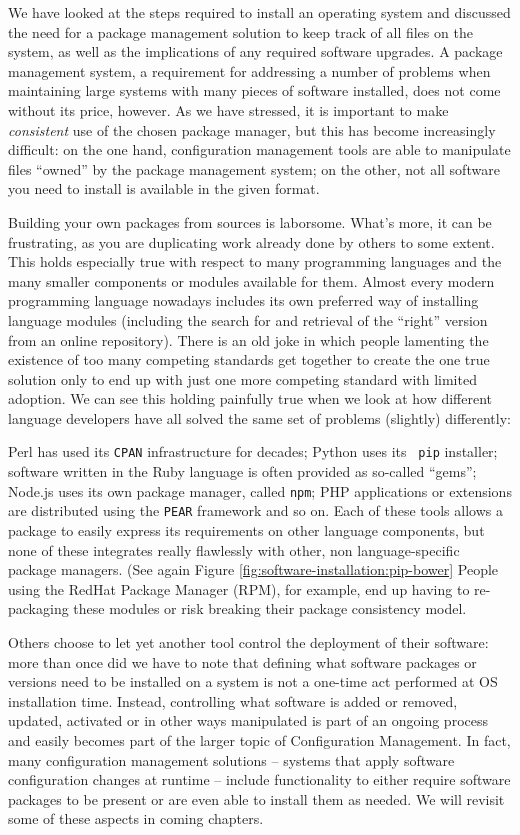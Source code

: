 We have looked at the steps required to install an
operating system and discussed the need for a package
management solution to keep track of all files on the
system, as well as the implications of any required
software upgrades.  A package management system, a
requirement for addressing a number of problems when
maintaining large systems with many pieces of software
installed, does not come without its price, however.
As we have stressed, it is important to make {\em
consistent} use of the chosen package manager, but
this has become increasingly difficult: on the one
hand, configuration management tools are able to
manipulate files ``owned'' by the package management
system; on the other, not all software you need to
install is available in the given format.

Building your own packages from sources is laborsome.
What's more, it can be frustrating, as you are
duplicating work already done by others to some
extent.  This holds especially true with respect to
many programming languages and the many smaller
components or modules available for them.  Almost
every modern programming language nowadays includes
its own preferred way of installing language modules
(including the search for and retrieval of the
``right'' version from an online repository).  There
is an old joke in which people lamenting the existence
of too many competing standards get together to create
the one true solution only to end up with just one
more competing standard with limited adoption.  We can
see this holding painfully true when we look at how
different language developers have all solved the same
set of problems (slightly) differently:

Perl has used its {\tt CPAN}
infrastructure for decades; Python uses its {\tt
pip} installer; software written in the
Ruby language is often provided as so-called
``gems''; Node.js uses its own package
manager, called {\tt npm}; PHP applications
or extensions are distributed using the {\tt PEAR}
framework and so on.  Each of these tools allows a
package to easily express its requirements on other
language components, but none of these integrates
really flawlessly with other, non language-specific
package managers. (See again Figure
\ref{fig:software-installation:pip-bower}  People
using the RedHat Package Manager (RPM), for
example, end up having to re-packaging these modules
or risk breaking their package consistency model.

Others choose to let yet another tool control the
deployment of their software: more than once did we
have to note that defining what software packages or
versions need to be installed on a system is not a
one-time act performed at OS installation time.
Instead, controlling what software is added or
removed, updated, activated or in other ways
manipulated is part of an ongoing process and easily
becomes part of the larger topic of Configuration
Management.  In fact,
many configuration management solutions -- systems
that apply software configuration changes at runtime
-- include functionality to either require software
packages to be present or are even able to install
them as needed.  We will revisit some of these aspects
in coming chapters.

